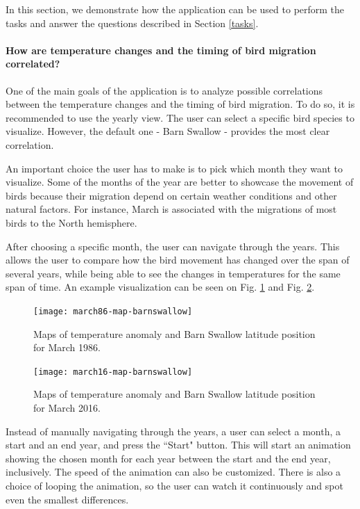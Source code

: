 \documentclass[journal]{vgtc}                %
\begin{document}
In this section, we demonstrate how the application can be used to perform the tasks and answer the questions described in Section \ref{tasks}.

\paragraph{How are temperature changes and the timing of bird migration correlated?}

One of the main goals of the application is to analyze possible correlations between the temperature changes and the timing of bird migration. To do so, it is recommended to use the yearly view. The user can select a specific bird species to visualize. However, the default one - Barn Swallow - provides the most clear correlation.

An important choice the user has to make is to pick which month they want to visualize. Some of the months of the year are better to showcase the movement of birds because their migration depend on certain weather conditions and other natural factors. For instance, March is associated with the migrations of most birds to the North hemisphere.

After choosing a specific month, the user can navigate through the years. This allows the user to compare how the bird movement has changed over the span of several years, while being able to see the changes in temperatures for the same span of time. An example visualization can be seen on Fig. \ref{fig:swallow-map-86} and Fig. \ref{fig:swallow-map-16}.

\begin{figure}[h]
  \centering
  \texttt{[image: march86-map-barnswallow]}
  \caption{Maps of temperature anomaly and Barn Swallow latitude position for March 1986.}
  \label{fig:swallow-map-86}
\end{figure}

\begin{figure}[h]
  \centering
  \texttt{[image: march16-map-barnswallow]}
  \caption{Maps of temperature anomaly and Barn Swallow latitude position for March 2016.}
  \label{fig:swallow-map-16}
\end{figure}

Instead of manually navigating through the years, a user can select a month, a start and an end year, and press the ``Start" button. This will start an animation showing the chosen month for each year between the start and the end year, inclusively. The speed of the animation can also be customized. There is also a choice of looping the animation, so the user can watch it continuously and spot even the smallest differences.
\end{document}
